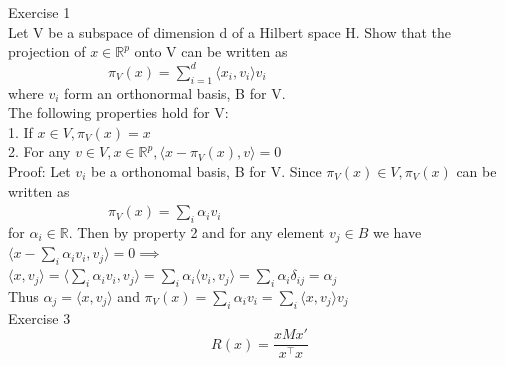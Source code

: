 \documentclass[18pt]{article}
\author{Adam Handwerger}
\begin{document}
\begin{flushleft}
Exercise 1\\
Let V be a subspace of dimension d of a Hilbert space H. Show that the \\
projection of $x \in \mathbb{R}^p$ onto V can be written as\\
\vspace{.4cm}
$\hspace{3cm} \pi_V(x)=\sum\limits_{i=1}^d \langle x_i,v_i \rangle v_i$\\
\vspace{.4cm}
where $v_i$ form an orthonormal basis, B for V.\\
\vspace{.4cm}
The following properties hold for V:\\
1. If $x\in V,\pi_V(x)=x$\\
2. For any $v\in V,x \in \mathbb{R}^p, \langle x-\pi_V(x),v\rangle=0$\\
\vspace{.4cm}
Proof: Let $v_i$ be a orthonomal basis, B for V. Since $\pi_V(x)\in V, \pi_V(x)$ can be written as\\
$\hspace{3cm} \pi_V(x)=\sum\limits_i \alpha_i v_i$\\
for $\alpha_i \in \mathbb{R}$.
\vspace{.4cm}
Then by property 2 and for any element $v_j \in B$ we have\\
\vspace{.4cm}
$\langle x-\sum\limits_i \alpha_i v_i,v_j \rangle=0 \implies$\\
$\langle x,v_j \rangle=\langle \sum_i \alpha_i v_i,v_j\rangle=\sum_i \alpha_i \langle v_i,v_j \rangle=\sum_i \alpha_i \delta_{ij}=\alpha_j$\\
\vspace{.4cm}
Thus $\alpha_j=\langle x,v_j \rangle$ and $\pi_V(x)=\sum\limits_i \alpha_i v_i=\sum\limits_i \langle x,v_j \rangle v_j$\\
\vspace{.4cm}
Exercise 3
$$
R(x)=\dfrac {x M x'}{x^{\top} x}
$$


\end{flushleft}
\end{document}
